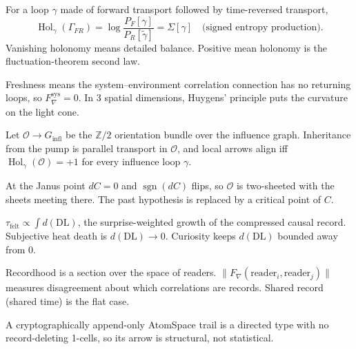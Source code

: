 \documentclass[11pt]{article}
\begin{document}
\begin{proposition}
For a loop $\gamma$ made of forward transport followed by time-reversed transport,
\[
  \operatorname{Hol}_\gamma(\Gamma_{FR}) = \log\frac{P_F[\gamma]}{P_R[\tilde\gamma]}
  = \Sigma[\gamma]\quad\text{(signed entropy production)}.
\]
Vanishing holonomy means detailed balance. Positive mean holonomy is the
fluctuation-theorem second law.
\end{proposition}

\begin{proposition}
Freshness means the system--environment correlation connection has no
returning loops, so $F_\nabla^{\mathrm{sys}}=0$. In $3$ spatial dimensions,
Huygens' principle puts the curvature on the light cone.
\end{proposition}

\begin{proposition}
Let $\mathcal{O}\to G_{\mathrm{infl}}$ be the $\mathbb{Z}/2$ orientation bundle
over the influence graph. Inheritance from the pump is parallel transport in
$\mathcal{O}$, and local arrows align iff $\operatorname{Hol}_\gamma(\mathcal{O})=+1$
for every influence loop $\gamma$.
\end{proposition}

\begin{proposition}
At the Janus point $dC=0$ and $\operatorname{sgn}(dC)$ flips, so $\mathcal{O}$
is two-sheeted with the sheets meeting there. The past hypothesis is
replaced by a critical point of $C$.
\end{proposition}

\begin{proposition}
$\tau_{\mathrm{felt}} \propto \int d(\mathrm{DL})$, the surprise-weighted
growth of the compressed causal record. Subjective heat death is
$d(\mathrm{DL})\to 0$. Curiosity keeps $d(\mathrm{DL})$ bounded away from $0$.
\end{proposition}

\begin{proposition}
Recordhood is a section over the space of readers.
$\|F_\nabla(\mathrm{reader}_i,\mathrm{reader}_j)\|$ measures disagreement about
which correlations are records. Shared record (shared time) is the flat case.
\end{proposition}

\begin{proposition}
A cryptographically append-only AtomSpace trail is a directed type with no
record-deleting 1-cells, so its arrow is structural, not statistical.
\end{proposition}
\end{document}
